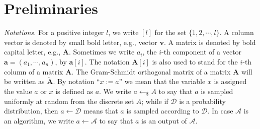 \documentclass[runningheads]{llncs}
\begin{document}
\section{Preliminaries} \label{pre}
\textit{Notations.}
For a positive integer $l$, we write $[l]$ for the set $\{1, 2, \cdots , l\}$. A column vector is denoted by small bold letter, e.g., vector $\mathbf{v}$. A matrix is denoted by bold capital letter, e.g., $\mathbf{A}$. 
Sometimes we write $a_i$, the $i$-th component of a vector $\mathbf{a}=(a_1, \cdots, a_n)$, by $\mathbf{a}[i]$. The notation $\mathbf{A}[i]$ is also used to stand for the $i$-th column of a matrix $\mathbf{A}$. The Gram-Schmidt orthogonal matrix of a matrix $\mathbf{A}$ will be written as $\tilde{\mathbf{A}}$. By notation ``$x:=a$'' we mean that the variable $x$ is assigned the value $a$ or $x$ is defined as $a$.  %
 We write $a \leftarrow_{\$} A$ to say that $a$ is sampled uniformly at random from the discrete set $A$; while if  $\mathcal{D}$ is a probability distribution, then $a \leftarrow \mathcal{D}$ means that $a$ is sampled according to $\mathcal{D} $. In case $\mathcal{A}$ is an algorithm, we write $a \leftarrow \mathcal{A}$ to say that $a$ is an output of $\mathcal{A}$.
  
\end{document}
